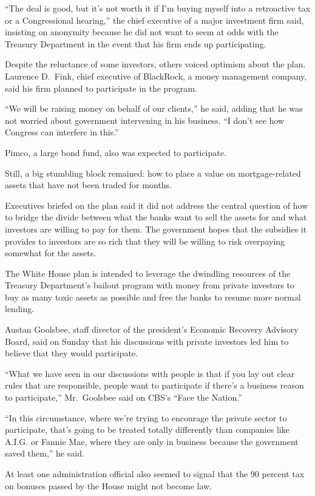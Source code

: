 \documentclass[12pt,a4paper,onecolumn]{article}
\begin{document}
\begin{CJK*}{GBK}{song}
``The deal is good, but it's not worth it if I'm buying myself into a retroactive tax or a
Congressional hearing,'' the chief executive of a major investment firm said, insisting on anonymity
because he did not want to seem at odds with the Treasury Department in the event that his firm ends
up participating.

Despite the reluctance of some investors, others voiced optimism about the plan. Laurence D.~Fink,
chief executive of BlackRock, a money management company, said his firm planned to participate in
the program.

``We will be raising money on behalf of our clients,'' he said, adding that he was not worried about
government intervening in his business. ``I don't see how Congress can interfere in this.''

Pimco, a large bond fund, also was expected to participate.

Still, a big stumbling block remained: how to place a value on mortgage-related assets that have not
been traded for months.

Executives briefed on the plan said it did not address the central question of how to bridge the
divide between what the banks want to sell the assets for and what investors are willing to pay for
them. The government hopes that the subsidies it provides to investors are so rich that they will be
willing to risk overpaying somewhat for the assets.

The White House plan is intended to leverage the dwindling resources of the Treasury Department's
bailout program with money from private investors to buy as many toxic assets as possible and free
the banks to resume more normal lending.

Austan Goolsbee, staff director of the president's Economic Recovery Advisory Board, said on Sunday
that his discussions with private investors led him to believe that they would participate.

``What we have seen in our discussions with people is that if you lay out clear rules that are
responsible, people want to participate if there's a business reason to participate,'' Mr.~Goolsbee
said on CBS's ``Face the Nation.''

``In this circumstance, where we're trying to encourage the private sector to participate, that's
going to be treated totally differently than companies like A.I.G. or Fannie Mae, where they are
only in business because the government saved them,'' he said.

At least one administration official also seemed to signal that the 90 percent tax on bonuses passed
by the House might not become law.


\end{CJK*}
\end{document}

